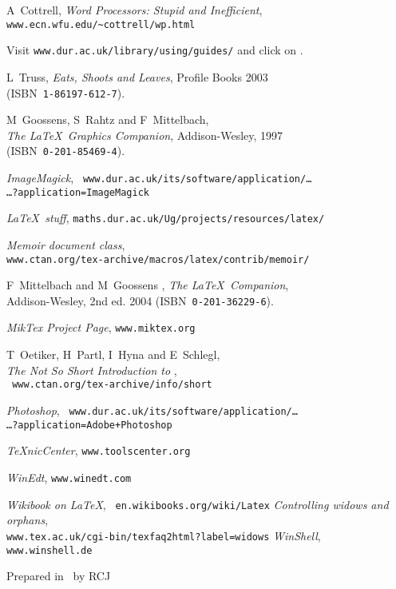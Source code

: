 \begin{thebibliography}{9999}

A~Cottrell, \textsl{Word Processors: Stupid and
Inefficient},
\\ \mbox{}\hfill\texttt{www.ecn.wfu.edu/\~{}cottrell/wp.html}

Visit \texttt{www.dur.ac.uk/library/using/guides/}
and click on .

L~Truss, \textsl{Eats, Shoots and Leaves}, Profile
  Books 2003\\ \mbox{}\hfill(ISBN~\texttt{1-86197-612-7}).

M~Goossens, S~Rahtz and F~Mittelbach,\\
  \mbox{}\hfill \textsl{The \LaTeX\ Graphics Companion},
  Addison-Wesley, 1997\\  \mbox{}\hfill(ISBN~\texttt{0-201-85469-4}).

 \textsl{ImageMagick}, {\tt%
www.dur.ac.uk/its/software/application/\dots
\\ \mbox{}\hfill\dots?application=ImageMagick}

 \textsl{\LaTeX\ stuff},
	\texttt{maths.dur.ac.uk/Ug/projects/resources/latex/}

 \textsl{Memoir document class},\\ \mbox{}\hfill
   \texttt{www.ctan.org/tex-archive/macros/latex/contrib/memoir/}

F~Mittelbach and M~Goossens \etal, \textsl{The
\LaTeX\ Companion},\\  \mbox{}\hfill Addison-Wesley, 2nd ed. 2004
(ISBN~\texttt{0-201-36229-6}).

 \textsl{MikTex Project Page}, \texttt{www.miktex.org}

T~Oetiker, H~Partl, I~Hyna and E~Schlegl,\\
\mbox{}\hfill
\textsl{The Not So Short Introduction to \LaTeXe},\\ \mbox{}\hfill{\tt
www.ctan.org/tex-archive/info/short}

 \textsl{Photoshop}, {\tt%
www.dur.ac.uk/its/software/application/\dots
\\ \mbox{}\hfill\dots?application=Adobe+Photoshop}

 \textsl{TeXnicCenter}, \texttt{www.toolscenter.org}

 \textsl{WinEdt}, \texttt{www.winedt.com}

 \textsl{Wikibook on \LaTeX}, \texttt{%
	en.wikibooks.org/wiki/Latex}
 \textsl{Controlling widows and orphans}, 
\\ \mbox{}\hfill\texttt{www.tex.ac.uk/cgi-bin/texfaq2html?label=widows}
 \textsl{WinShell}, \texttt{www.winshell.de}
\end{thebibliography}
\vfill
\begin{flushright}\small Prepared in \LaTeXe\ by RCJ\end{flushright}
